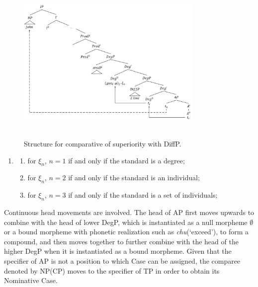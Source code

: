 \documentclass{ctexart}
\begin{document}
\begin{figure}[H]
    \centering
    \includegraphics[width=0.8\textwidth]{pic/superiority_structure_diff.png}
    \begin{caption}
        \\ \vspace{-1.1ex}
        Structure for comparative of superiority with DiffP.
    \end{caption}
\end{figure}

\begin{enumerate}
    \item \label{superiority_example_10}
    \begin{enumerate}
        \item \label{superiority_example_10_a}
        for $\xi_n$, $n=1$ if and only if the standard is a degree;

        \item \label{superiority_example_10_b}
        for $\xi_n$, $n=2$ if and only if the standard is an individual;

        \item \label{superiority_example_10_c}
        for $\xi_n$, $n=3$ if and only if the standard is a set of individuals;

    \end{enumerate}
\end{enumerate}

Continuous head movements are involved. The head of AP first moves upwards to combine with the head of lower DegP, which is instantiated as a null morpheme $\emptyset$ or a bound morpheme with phonetic realization such as \textit{chu}(`exceed'), to form a compound, and then moves together to further combine with the head of the higher DegP when it is instantiated as a bound morpheme. Given that the specifier of AP is not a position to which Case can be assigned, the comparee denoted by NP(CP) moves to the specifier of TP in order to obtain its Nominative Case.
\end{document}
